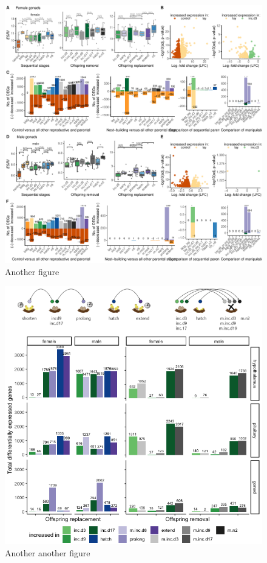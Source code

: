 \begin{figure}[h]
  \centering
  \includegraphics[width=1.0\textwidth]{../../figures/fig4-1}
  \caption{Another figure}
  \label{figure:fig4}
\end{figure}

\begin{figure}[h]
  \centering
  \includegraphics[width=1.0\textwidth]{../../figures/fig5-1}
  \caption{Another another figure}
  \label{figure:fig5}
\end{figure}

